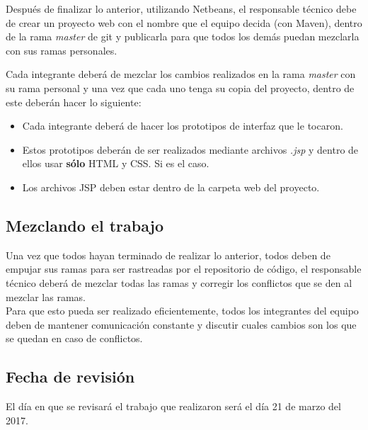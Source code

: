 \documentclass[11pt]{article}
\begin{document}
Después de finalizar lo anterior, utilizando Netbeans, el responsable
técnico debe de crear un proyecto web con el nombre que el equipo
decida (con Maven), dentro de la rama \textit{master} de git y
publicarla para que todos los demás puedan mezclarla con sus ramas
personales.

Cada integrante deberá de mezclar los cambios realizados en la rama
\textit{master} con su rama personal y una vez que cada uno tenga su
copia del proyecto, dentro de este deberán hacer lo siguiente:

\begin{itemize}
  \item Cada integrante deberá de hacer los prototipos de interfaz que
    le tocaron.
  \item Estos prototipos deberán de ser realizados mediante archivos
    \textit{.jsp} y dentro de ellos usar \textbf{sólo} HTML y CSS. Si
    es el caso.
  \item Los archivos JSP deben estar dentro de la carpeta web del
    proyecto.
\end{itemize}

\subsection*{Mezclando el trabajo}

Una vez que todos hayan terminado de realizar lo anterior, todos deben
de empujar sus ramas para ser rastreadas por el repositorio de código,
el responsable técnico deberá de mezclar todas las ramas y corregir
los conflictos que se den al mezclar las ramas.\\
Para que esto pueda ser realizado eficientemente, todos los
integrantes del equipo deben de mantener comunicación constante y
discutir cuales cambios son los que se quedan en caso de conflictos.

\subsection*{Fecha de revisión}
El día en que se revisará el trabajo que realizaron será el día 21 de
marzo del 2017.
\end{document}
